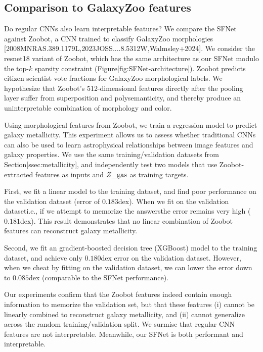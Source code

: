 \documentclass[11pt,a4paper]{article}
\begin{document}
\subsection{Comparison to GalaxyZoo features}

Do regular CNNs also learn interpretable features?
We compare the SFNet against Zoobot, a CNN trained to classify GalaxyZoo morphologies [2008MNRAS.389.1179L,2023JOSS....8.5312W,Walmsley+2024]. We consider the resnet18 variant of Zoobot, which has the same architecture as our SFNet modulo the top-$k$ sparsity constraint (Figure[fig:SFNet-architecture]). Zoobot predicts citizen scientist vote fractions for GalaxyZoo morphological labels. We hypothesize that Zoobot's 512-dimensional features directly after the pooling layer suffer from superposition and polysemanticity, and thereby produce an uninterpretable combination of morphology and color.

Using morphological features from Zoobot, we train a regression model to predict galaxy metallicity. This experiment allows us to assess whether traditional CNNs can also be used to learn astrophysical relationships between image features and galaxy properties.  We use the same training/validation datasets from Section[ssec:metallicity], and independently test two models that use Zoobot-extracted features as inputs and $Z\_{\rm gas}$ as training targets.

First, we fit a linear model to the training dataset, and find poor performance on the validation dataset (error of $0.183$dex). When we fit on the validation dataseti.e., if we attempt to memorize the answersthe error remains very high ($0.181$dex). This result demonstrates that no linear combination of Zoobot features can reconstruct galaxy metallicity.

Second, we fit an gradient-boosted decision tree (XGBoost) model to the training dataset, and achieve only $0.180$dex error on the validation dataset. However, when we cheat by fitting on the validation dataset, we can lower the error down to $0.085$dex (comparable to the SFNet performance).

Our experiments confirm that the Zoobot features indeed contain enough information to memorize the validation set, but that these features (i) cannot be linearly combined to reconstruct galaxy metallicity, and (ii) cannot generalize across the random training/validation split. We surmise that regular CNN features are not interpretable. Meanwhile, our SFNet is both performant and interpretable.
\end{document}
